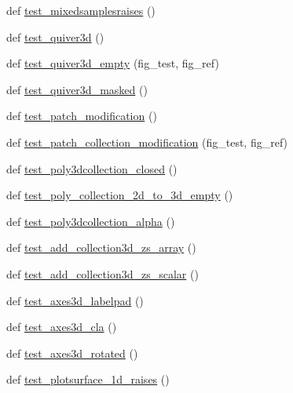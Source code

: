 \begin{DoxyCompactItemize}
\item 
def \hyperlink{namespacetests_1_1test__mplot3d_a7365660b9dc0f78808a75e99f781f4be}{test\+\_\+mixedsamplesraises} ()
\item 
def \hyperlink{namespacetests_1_1test__mplot3d_ac48649f99fb8a07591d54ae52ef26011}{test\+\_\+quiver3d} ()
\item 
def \hyperlink{namespacetests_1_1test__mplot3d_a40b71db7c5c365e9df61993fe61b4884}{test\+\_\+quiver3d\+\_\+empty} (fig\+\_\+test, fig\+\_\+ref)
\item 
def \hyperlink{namespacetests_1_1test__mplot3d_aadd218e217184422ac5a6cca4f0ecf4a}{test\+\_\+quiver3d\+\_\+masked} ()
\item 
def \hyperlink{namespacetests_1_1test__mplot3d_ab352e8d282f3a2c770c3eeb1a014549d}{test\+\_\+patch\+\_\+modification} ()
\item 
def \hyperlink{namespacetests_1_1test__mplot3d_af8b2514783bfed4c8a779197ce2e544b}{test\+\_\+patch\+\_\+collection\+\_\+modification} (fig\+\_\+test, fig\+\_\+ref)
\item 
def \hyperlink{namespacetests_1_1test__mplot3d_ab983769336e6f1b79c0db2e8ef4d6d57}{test\+\_\+poly3dcollection\+\_\+closed} ()
\item 
def \hyperlink{namespacetests_1_1test__mplot3d_a2fc8f058f6f0b44a1cf6513dcd9140a7}{test\+\_\+poly\+\_\+collection\+\_\+2d\+\_\+to\+\_\+3d\+\_\+empty} ()
\item 
def \hyperlink{namespacetests_1_1test__mplot3d_a6446912eec3a8072031b07cae4b7ab70}{test\+\_\+poly3dcollection\+\_\+alpha} ()
\item 
def \hyperlink{namespacetests_1_1test__mplot3d_ae9cecf69388aa4944b0b7e551117b0a0}{test\+\_\+add\+\_\+collection3d\+\_\+zs\+\_\+array} ()
\item 
def \hyperlink{namespacetests_1_1test__mplot3d_a1370d58d75f3348e2643d251f17dfc4d}{test\+\_\+add\+\_\+collection3d\+\_\+zs\+\_\+scalar} ()
\item 
def \hyperlink{namespacetests_1_1test__mplot3d_a664e214b2aa6d58516073ad349c39211}{test\+\_\+axes3d\+\_\+labelpad} ()
\item 
def \hyperlink{namespacetests_1_1test__mplot3d_a8e48ed4368cf26d9baca26c1f0fc7d2b}{test\+\_\+axes3d\+\_\+cla} ()
\item 
def \hyperlink{namespacetests_1_1test__mplot3d_a209ff9579d75e4851e59fd18afcd0594}{test\+\_\+axes3d\+\_\+rotated} ()
\item 
def \hyperlink{namespacetests_1_1test__mplot3d_a686bd16c51a2b9b5b52c4bf5b6349bc8}{test\+\_\+plotsurface\+\_\+1d\+\_\+raises} ()

\end{DoxyCompactItemize}
